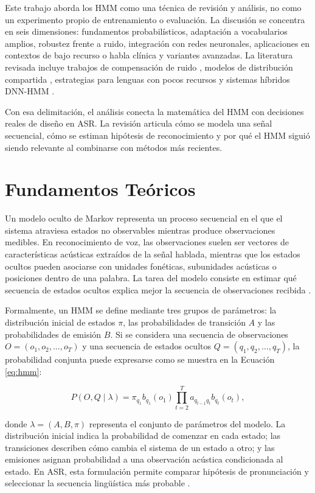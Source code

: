 Este trabajo aborda los HMM como una técnica de revisión y análisis, no como un experimento propio de entrenamiento o evaluación. La discusión se concentra en seis dimensiones: fundamentos probabilísticos, adaptación a vocabularios amplios, robustez frente a ruido, integración con redes neuronales, aplicaciones en contextos de bajo recurso o habla clínica y variantes avanzadas. La literatura revisada incluye trabajos de compensación de ruido \cite{Vaseghi1997NoiseCompen}, modelos de distribución compartida \cite{MeiYuhHwang1993SharedDistri}, estrategias para lenguas con pocos recursos \cite{DeWet2017SpeechRecogn} y sistemas híbridos DNN-HMM \cite{Shanthamallappa2026DeepNeural}.

Con esa delimitación, el análisis conecta la matemática del HMM con decisiones reales de diseño en ASR. La revisión articula cómo se modela una señal secuencial, cómo se estiman hipótesis de reconocimiento y por qué el HMM siguió siendo relevante al combinarse con métodos más recientes.

\section{Fundamentos Teóricos}
Un modelo oculto de Markov representa un proceso secuencial en el que el sistema atraviesa estados no observables mientras produce observaciones medibles. En reconocimiento de voz, las observaciones suelen ser vectores de características acústicas extraídos de la señal hablada, mientras que los estados ocultos pueden asociarse con unidades fonéticas, subunidades acústicas o posiciones dentro de una palabra. La tarea del modelo consiste en estimar qué secuencia de estados ocultos explica mejor la secuencia de observaciones recibida \cite{Rabiner1989TutoriHidden}.

Formalmente, un HMM se define mediante tres grupos de parámetros: la distribución inicial de estados $\pi$, las probabilidades de transición $A$ y las probabilidades de emisión $B$. Si se considera una secuencia de observaciones $O=(o_1,o_2,\ldots,o_T)$ y una secuencia de estados ocultos $Q=(q_1,q_2,\ldots,q_T)$, la probabilidad conjunta puede expresarse como se muestra en la Ecuación \ref{eq:hmm}:

\begin{equation}
P(O,Q \mid \lambda)=\pi_{q_1}b_{q_1}(o_1)
\prod_{t=2}^{T}a_{q_{t-1}q_t}b_{q_t}(o_t),
\label{eq:hmm}
\end{equation}

donde $\lambda=(A,B,\pi)$ representa el conjunto de parámetros del modelo. La distribución inicial indica la probabilidad de comenzar en cada estado; las transiciones describen cómo cambia el sistema de un estado a otro; y las emisiones asignan probabilidad a una observación acústica condicionada al estado. En ASR, esta formulación permite comparar hipótesis de pronunciación y seleccionar la secuencia lingüística más probable \cite{Rabiner1989TutoriHidden,Juang1991HiddenMarkov}.

